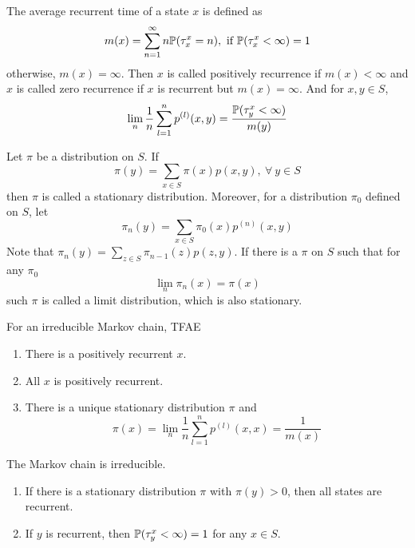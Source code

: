 \documentclass[a4paper,12pt]{article}
\begin{document}
\begin{itemize}
  \noindent The average recurrent time of a state $x$ is defined as
  \begin{equation*}
    m(x) = \sum_{n=1}^{\infty}n\mathbb{P}(\tau_x^x=n),~\text{if } \mathbb{P}(\tau_x^x < \infty) = 1
  \end{equation*}
  otherwise, $m(x) = \infty$. Then $x$ is called positively recurrence if $m(x) < \infty$ and $x$ is called zero recurrence if $x$ is recurrent but $m(x) = \infty$. And for $x, y \in S$, 
  \begin{equation*}
    \lim_n \frac{1}{n}\sum_{l=1}^n p^{(l)}(x,y) = \frac{\mathbb{P}(\tau^x_y < \infty)}{m(y)}
  \end{equation*}

  \noindent Let $\pi$ be a distribution on $S$. If
  \begin{equation*}
    \pi(y) = \sum_{x\in S}\pi(x)p(x,y),~\forall~y\in S
  \end{equation*}
  then $\pi$ is called a stationary distribution. Moreover, for a distribution $\pi_0$ defined on $S$, let 
  \begin{equation*}
    \pi_n(y) = \sum_{x \in S}\pi_0(x)p^{(n)}(x,y)
  \end{equation*}
  Note that $\pi_n(y) = \sum_{z \in S}\pi_{n-1}(z)p(z,y)$. If there is a $\pi$ on $S$ such that for any $\pi_0$
  \begin{equation*}
    \lim_{n}\pi_n(x) = \pi(x)
  \end{equation*}
  such $\pi$ is called a limit distribution, which is also stationary.

  \begin{thm}
    For an irreducible Markov chain, TFAE
    \begin{enumerate}[label=(\arabic*)]
      \item There is a positively recurrent $x$.
      \item All $x$ is positively recurrent.
      \item There is a unique stationary distribution $\pi$ and
      \begin{equation*}
        \pi(x) = \lim_n \frac{1}{n}\sum_{l=1}^n p^{(l)}(x,x) = \frac{1}{m(x)}
      \end{equation*}
    \end{enumerate}
  \end{thm}

  \begin{thm}
    The Markov chain is irreducible.
    \begin{enumerate}[label=(\arabic*)]
      \item If there is a stationary distribution $\pi$ with $\pi(y) > 0$, then all states are recurrent.
      \item If $y$ is recurrent, then $\mathbb{P}(\tau_y^x < \infty) = 1$ for any $x \in S$.
    \end{enumerate}
  \end{thm}


\end{itemize}
\end{document}
